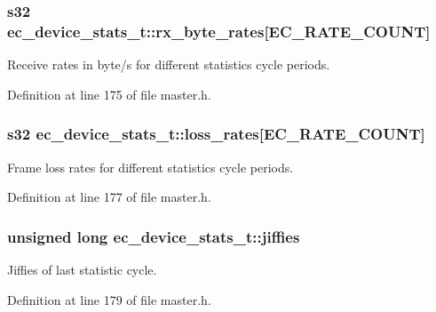 \subsubsection[{rx\-\_\-byte\-\_\-rates}]{\setlength{\rightskip}{0pt plus 5cm}s32 {\bf ec\-\_\-device\-\_\-stats\-\_\-t\-::rx\-\_\-byte\-\_\-rates}[{\bf \-E\-C\-\_\-\-R\-A\-T\-E\-\_\-\-C\-O\-U\-N\-T}]}\label{structec__device__stats__t_a2f9e55c67c34fec5e5d67230598b80d1}


\-Receive rates in byte/s for different statistics cycle periods. 



\-Definition at line 175 of file master.\-h.

\subsubsection[{loss\-\_\-rates}]{\setlength{\rightskip}{0pt plus 5cm}s32 {\bf ec\-\_\-device\-\_\-stats\-\_\-t\-::loss\-\_\-rates}[{\bf \-E\-C\-\_\-\-R\-A\-T\-E\-\_\-\-C\-O\-U\-N\-T}]}\label{structec__device__stats__t_a3dfa4926b342dd6567647b5a368f224a}


\-Frame loss rates for different statistics cycle periods. 



\-Definition at line 177 of file master.\-h.

\subsubsection[{jiffies}]{\setlength{\rightskip}{0pt plus 5cm}unsigned long {\bf ec\-\_\-device\-\_\-stats\-\_\-t\-::jiffies}}\label{structec__device__stats__t_afd23f1645bfbf7a505dc4e8b5ac5eca0}


\-Jiffies of last statistic cycle. 



\-Definition at line 179 of file master.\-h.

